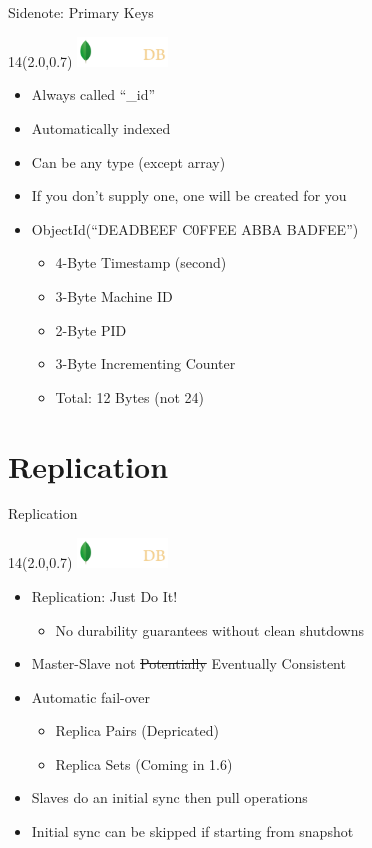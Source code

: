 \documentclass{beamer}
\newcommand{\MongoLogo}{
\begin{textblock}{14}(2.0,0.7)
  \includegraphics[height=0.8cm]{logo-mongodb-ondark.png}
\end{textblock}
}
\begin{document}
\begin{frame}[fragile]{Sidenote: Primary Keys}
  \MongoLogo

  \begin{itemize}
    \item Always called ``\_id''
    \item Automatically indexed
    \item Can be any type (except array)
    \item If you don't supply one, one will be created for you
    \item ObjectId(``{\color{green}DEADBEEF}
                     {\color{blue}C0FFEE}
                     {\color{orange}ABBA}
                     {\color{red}BADFEE}'')
         \begin{itemize}
           \item {\color{green} 4-Byte Timestamp (second)}
           \item {\color{blue} 3-Byte Machine ID}
           \item {\color{orange} 2-Byte PID}
           \item {\color{red} 3-Byte Incrementing Counter}
           \item Total: 12 Bytes (not 24)
         \end{itemize}
  \end{itemize}

\end{frame}


\section{Replication}

\begin{frame}[fragile]{Replication}
  \MongoLogo

  \begin{itemize}
      \item Replication: Just Do It!
        \begin{itemize}
          \item No durability guarantees without clean shutdowns
        \end{itemize}
      \item Master-Slave not \sout{Potentially} Eventually Consistent
      \item Automatic fail-over
        \begin{itemize}
          \item Replica Pairs (Depricated)
          \item Replica Sets (Coming in 1.6)
        \end{itemize}
      \item Slaves do an initial sync then pull operations
      \item Initial sync can be skipped if starting from snapshot
  \end{itemize}
\end{frame}
\end{document}
